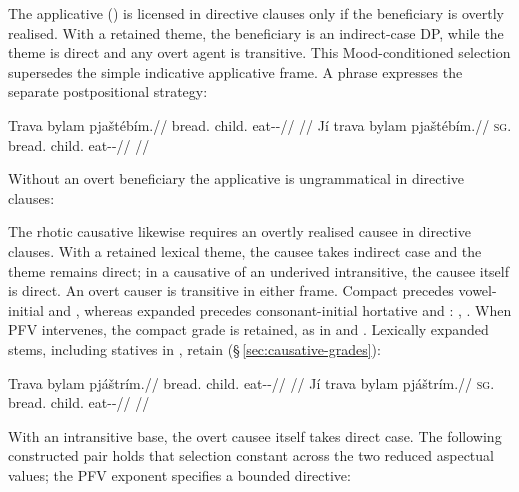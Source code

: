 The applicative () is licensed in directive clauses only if the
beneficiary is overtly realised. With a retained theme, the beneficiary is an
indirect-case DP, while the theme is direct and any overt agent is transitive.
This Mood-conditioned selection supersedes the simple indicative applicative
frame. A  phrase expresses the separate postpositional strategy:

\pex\label{ex:val-directive-appl}
\a
\begingl
\gla Trava bylam pjaštébím.//
\glb bread.\Dir{} child.\Ind{} eat-\Appl{}-\Imp{}//
\glft {} //
\endgl
\a
\begingl
\gla Jí trava bylam pjaštébím.//
\textsc{sg}.\Trs{} bread.\Dir{} child.\Ind{} eat-\Appl{}-\Imp{}//
\glft {} //
\endgl
\xe

\noindent Without an overt beneficiary the applicative is ungrammatical in
directive clauses:

\pex
{}  
\xe

The rhotic causative likewise requires an overtly realised causee in
directive clauses. With a retained lexical theme, the causee takes indirect case
and the theme remains direct; in a causative of an underived intransitive, the
causee itself is direct. An overt causer is transitive in either frame.
Compact  precedes vowel-initial  and ,
whereas expanded  precedes consonant-initial hortative
 and : , .
When PFV  intervenes, the compact grade is retained, as in
 and . Lexically expanded stems,
including statives in , retain 
(§\,\ref{sec:causative-grades}):

\pex\label{ex:val-directive-caus}
\a
\begingl
\gla Trava bylam pjáštrím.//
\glb bread.\Dir{} child.\Ind{} eat-\Caus{}-\Imp{}//
\glft {} //
\endgl
\a
\begingl
\gla Jí trava bylam pjáštrím.//
\textsc{sg}.\Trs{} bread.\Dir{} child.\Ind{} eat-\Caus{}-\Imp{}//
\glft {} //
\endgl
\xe

With an intransitive base, the overt causee itself takes direct case. The
following constructed pair holds that selection constant across the two
reduced aspectual values; the PFV exponent specifies a bounded directive:

